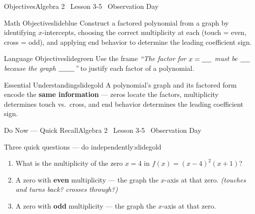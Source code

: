 \documentclass[aspectratio=169, 11pt]{beamer}
\begin{document}

\begin{frame}{Objectives}{Algebra 2 \textperiodcentered\ Lesson 3-5 \textperiodcentered\ Observation Day}
\vspace{0.15cm}
\begin{projcard}{Math Objective}{slideblue}
Construct a factored polynomial from a graph by identifying $x$-intercepts,
choosing the correct multiplicity at each (touch = even, cross = odd), and
applying end behavior to determine the leading coefficient sign.
\end{projcard}
\vspace{-0.1cm}
\begin{projcard}{Language Objective}{slidegreen}
Use the frame \textit{``The factor for $x = \underline{\hspace{0.5cm}}$ must be
$\underline{\hspace{0.5cm}}$ because the graph $\underline{\hspace{0.8cm}}$''}
to justify each factor of a polynomial.
\end{projcard}
\vspace{-0.1cm}
\begin{projcard}{Essential Understanding}{slidegold}
A polynomial's graph and its factored form encode the \textbf{same information} ---
zeros locate the factors, multiplicity determines touch vs.\ cross, and end behavior
determines the leading coefficient sign.
\end{projcard}
\end{frame}

\begin{frame}{Do Now --- Quick Recall}{Algebra 2 \textperiodcentered\ Lesson 3-5 \textperiodcentered\ Observation Day}
\vspace{0.15cm}
\begin{projcard}{Three quick questions --- do independently:}{slidegold}
\begin{enumerate}
  \setlength{\itemsep}{0.35cm}
  \item What is the multiplicity of the zero $x = 4$ in
        $f(x) = (x-4)^2(x+1)$? \quad \underline{\hspace{2cm}}
  \item A zero with \textbf{even} multiplicity --- the graph \underline{\hspace{3cm}} the $x$-axis at that zero.
        \textit{\small (touches and turns back? crosses through?)}
  \item A zero with \textbf{odd} multiplicity --- the graph \underline{\hspace{3cm}} the $x$-axis at that zero.
\end{enumerate}
\end{projcard}
\end{frame}
\end{document}
